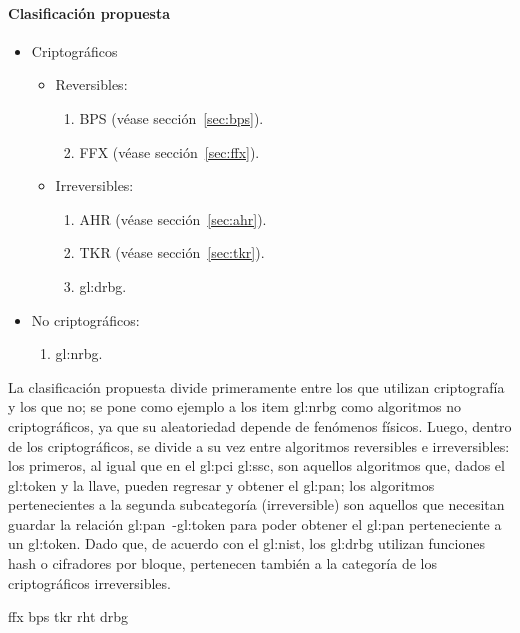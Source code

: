 \paragraph{Clasificación propuesta}
\begin{itemize}
  \item{Criptográficos}
    \begin{itemize}
      \item Reversibles:
        \begin{enumerate}
          \item BPS (véase sección~\ref{sec:bps}).
          \item FFX (véase sección~\ref{sec:ffx}).
        \end{enumerate}
      \item Irreversibles:
        \begin{enumerate}
          \item AHR (véase sección~\ref{sec:ahr}).
          \item TKR (véase sección~\ref{sec:tkr}).
          \item \gls{gl:drbg}.
        \end{enumerate}
    \end{itemize}
  \item No criptográficos:
    \begin{enumerate}
      \item \gls{gl:nrbg}.
    \end{enumerate}
\end{itemize}

La clasificación propuesta divide primeramente entre los que utilizan
criptografía y los que no; se pone como ejemplo a los item \gls{gl:nrbg} como
algoritmos no criptográficos, ya que su aleatoriedad depende de fenómenos físicos.
Luego, dentro de los criptográficos, se divide a su vez entre algoritmos
reversibles e irreversibles: los primeros, al igual que en el
\gls{gl:pci} \gls{gl:ssc}, son aquellos algoritmos que, dados el \gls{gl:token}
y la llave, pueden regresar y obtener el \gls{gl:pan}; los algoritmos
pertenecientes a la segunda subcategoría (irreversible) son aquellos que
necesitan guardar la relación \gls{gl:pan}~-\gls{gl:token} para poder obtener
el \gls{gl:pan} perteneciente a un \gls{gl:token}. Dado que, de acuerdo con el
\gls{gl:nist}, los \gls{gl:drbg} utilizan funciones hash o cifradores por
bloque, pertenecen también a la categoría de los criptográficos irreversibles.

{ffx}
{bps}
{tkr}
{rht}
{drbg}
